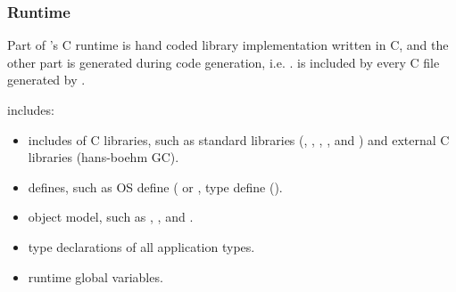 \documentclass[12pt]{article}
\begin{document}
\subsubsection{Runtime}

Part of \rjc 's C runtime is hand coded library implementation written in C,
and the other part is generated during code generation, i.e. . 
 is included by every C file generated by \rjc. 

 includes:

\begin{itemize}
\item includes of C libraries, such as standard libraries (, , ,
,  and ) and external C libraries (hans-boehm GC). 

\item defines, such as OS define ( or ,
type define (). 

\item \rjc object model, such as , ,
and . 

\item type declarations of all application types. 

\item runtime global variables. 


\end{itemize}
\end{document}
